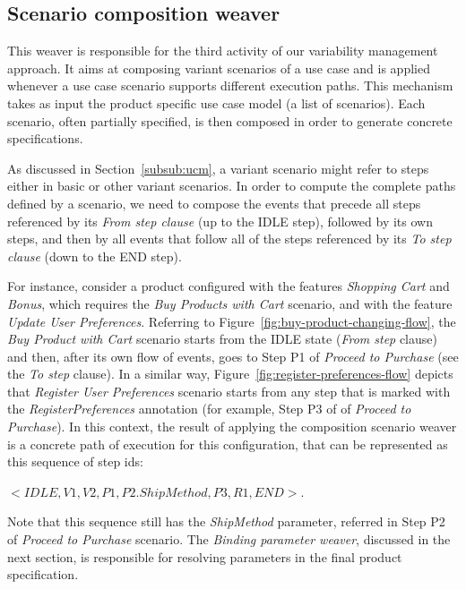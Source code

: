 \documentclass[11pt]{report}
\begin{document}

\subsection{Scenario composition weaver}\label{sub:sc-weaver}

This weaver is responsible for the third activity of our variability management 
approach. It aims at composing variant scenarios of a use case and is applied whenever a use case scenario supports different execution paths.
This mechanism takes as input the product specific use case model (a list of scenarios). Each scenario, often partially specified, is then composed in order to generate concrete specifications.

As discussed in Section~\ref{subsub:ucm}, a variant scenario 
might refer to steps either in basic or other variant scenarios. In order
to compute the complete paths defined by a scenario, we need to compose the events that precede all steps referenced by its \emph{From step
clause} (up to the IDLE step), followed by its own steps, and then by all
events that follow all of the steps referenced by its \emph{To step clause} (down to the END step). 

For instance, consider a product configured with the features \emph{Shopping Cart} and \emph{Bonus}, which requires the \emph{Buy Products with Cart} scenario, and with the feature \emph{Update User Preferences}. Referring to Figure~\ref{fig:buy-product-changing-flow}, the  \emph{Buy Product with Cart} scenario starts from the IDLE state (\emph{From step} clause) and then, after its own flow of events, goes to Step P1 of \emph{Proceed to Purchase} (see the \emph{To step} clause). In a similar way, Figure~\ref{fig:register-preferences-flow} depicts that \emph{Register User Preferences} scenario starts from any step that is marked with the \emph{RegisterPreferences} annotation (for example, Step P3 of of \emph{Proceed to Purchase}). In this context, the result of applying the composition scenario weaver is a concrete path of execution for this configuration, that can be represented as this sequence of step ids: 

\begin{center}
\begin{small}
\mbox{$<IDLE, V1, V2, P1, P2.ShipMethod, P3, R1, END>$}.
\end{small}
\end{center}

Note that this sequence still has  the \emph{ShipMethod} parameter, 
referred in Step P2 of \emph{Proceed to Purchase} scenario. The \emph{Binding parameter weaver}, discussed in the next section, is responsible for resolving parameters in the final 
product specification.  
\end{document}
